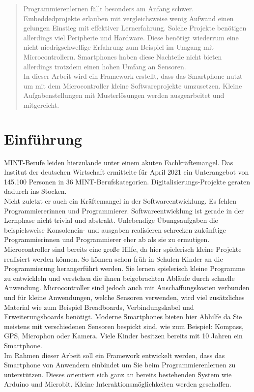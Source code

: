 \documentclass[11pt,a4paper]{report}
\begin{document}

\begin{abstract}
  Programmierenlernen fällt besonders am Anfang schwer.
  Embeddedprojekte erlauben mit vergleichsweise wenig Aufwand einen gelungen Einstieg mit effektiver Lernerfahrung.
  Solche Projekte benötigen allerdings viel Peripherie und Hardware.
  Diese benötigt wiederrum eine nicht niedrigschwellige Erfahrung zum Beispiel im Umgang mit Microcontrollern.
  Smartphones haben diese Nachteile nicht bieten allerdings trotzdem einen hohen Umfang an Sensoren.
  \\
  In dieser Arbeit wird ein Framework erstellt, dass das Smartphone nutzt um mit dem Microcontroller kleine Softwareprojekte umzusetzen.
  Kleine Aufgabenstellungen mit Musterlösungen werden ausgearbeitet und mitgereicht.
\end{abstract}

\tableofcontents

\chapter{Einführung} \label{chap:intro}
MINT-Berufe leiden hierzulande unter einem akuten Fachkräftemangel.
Das Institut der deutschen Wirtschaft ermittelte für April 2021 ein Unterangebot von 145.100 Personen \cite{mint_jahresreport} in 36 MINT-Berufskategorien. 
Digitalisierungs-Projekte geraten dadurch ins Stocken.
\\
Nicht zuletzt er auch ein Kräftemangel in der Softwareentwicklung.
Es fehlen Programmiererinnen und Programmierer.
Softwareentwicklung ist gerade in der Lernphase nicht trivial und abstrakt.
Unlebendige Übungsaufgaben die beispielsweise Konsolenein- und ausgaben realisieren schrecken zukünftige Programmierinnen und Programmierer eher ab als sie zu ermutigen.
\\
Microcontroller sind bereits eine große Hilfe, da hier spielerisch kleine Projekte realisiert werden können.
So können schon früh in Schulen Kinder an die Programmierung herangerführt werden.
Sie lernen spielerisch kleine Programme zu entwickleln und verstehen die ihnen beigebrachten Abläufe durch schnelle Anwendung.
Microcontroller sind jedoch auch mit Anschaffungskosten verbunden und für kleine Anwendungen, welche Sensoren verwenden, wird viel zusätzliches Material wie zum Beispiel Breadboards, Verbindungskabel und Erweiterungsboards benötigt.
Moderne Smartphones bieten hier Abhilfe da Sie meistens mit verschiedenen Sensoren bespickt sind, wie zum Beispiel: Kompass, GPS, Microphon oder Kamera.
Viele Kinder besitzen bereits mit 10 Jahren \cite{bitkom_smartphones} ein Smartphone. 
\\
Im Rahmen dieser Arbeit soll ein Framework entwickelt werden, dass das Smartphone von Anwendern einbindet um Sie beim Programmierenlernen zu unterstützen.
Dieses orientiert sich ganz an bereits bestehenden System wie Arduino und Microbit.
Kleine Interaktionsmöglichkeiten werden geschaffen.
\end{document}
